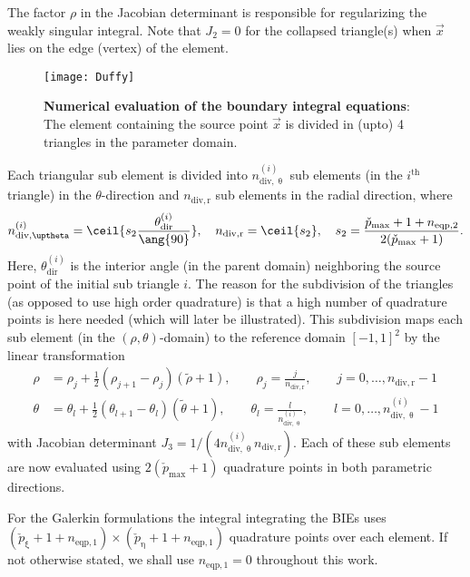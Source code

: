The factor $\rho$ in the Jacobian determinant is responsible for regularizing the weakly singular integral. Note that $J_2=0$ for the collapsed triangle(s) when $\vec{x}$ lies on the edge (vertex) of the element. 
\begin{figure}
	\centering
	\texttt{[image: Duffy]}
	\caption{\textbf{Numerical evaluation of the boundary integral equations}: The element containing the source point $\vec{x}$ is divided in (upto) 4 triangles in the parameter domain.}
	\label{Fig3:Duffy}
\end{figure}
Each triangular sub element is divided into $n_{\mathrm{div},\uptheta}^{(i)}$ sub elements (in the $i^{\mathrm{th}}$ triangle) in the $\theta$-direction and $n_{\mathrm{div},\mathrm{r}}$ sub elements in the radial direction, where
\begin{equation*}
	n_{\mathrm{div},\uptheta}^{(i)} = \ceil{s_2\frac{\theta_{\mathrm{dir}}^{(i)}}{\ang{90}}},\quad n_{\mathrm{div},\mathrm{r}} = \ceil{s_2},\quad s_2 = \frac{\check{p}_{\mathrm{max}}+1+n_{\mathrm{eqp},2}}{2(\check{p}_{\mathrm{max}}+1)}.
\end{equation*}
Here, $\theta_{\mathrm{dir}}^{(i)}$ is the interior angle (in the parent domain) neighboring the source point of the initial sub triangle $i$. The reason for the subdivision of the triangles (as opposed to use high order quadrature) is that a high number of quadrature points is here needed (which will later be illustrated). This subdivision maps each sub element (in the $(\rho,\theta)$-domain) to the reference domain $[-1,1]^2$ by the linear transformation
\begin{equation}
\begin{aligned}
	\rho &= \rho_j + \frac12(\rho_{j+1}-\rho_j)(\tilde{\rho}+1),\qquad\rho_j = \frac{j}{n_{\mathrm{div},\mathrm{r}}},\qquad j=0,\dots,n_{\mathrm{div},\mathrm{r}}-1\\
	\theta &= \theta_l + \frac12(\theta_{l+1}-\theta_l)(\tilde{\theta}+1),\qquad\theta_l=\frac{l}{n_{\mathrm{div},\uptheta}^{(i)}},\qquad l=0,\dots,n_{\mathrm{div},\uptheta}^{(i)}-1
\end{aligned}
\end{equation}
with Jacobian determinant $J_3=1/(4n_{\mathrm{div},\uptheta}^{(i)}n_{\mathrm{div},\mathrm{r}})$. Each of these sub elements are now evaluated using $2(\check{p}_{\mathrm{max}}+1)$ quadrature points in both parametric directions.

For the Galerkin formulations the integral integrating the BIEs uses $(\check{p}_\upxi+1+n_{\mathrm{eqp},1})\times(\check{p}_\upeta+1+n_{\mathrm{eqp},1})$ quadrature points over each element. If not otherwise stated, we shall use $n_{\mathrm{eqp},1}=0$ throughout this work.


